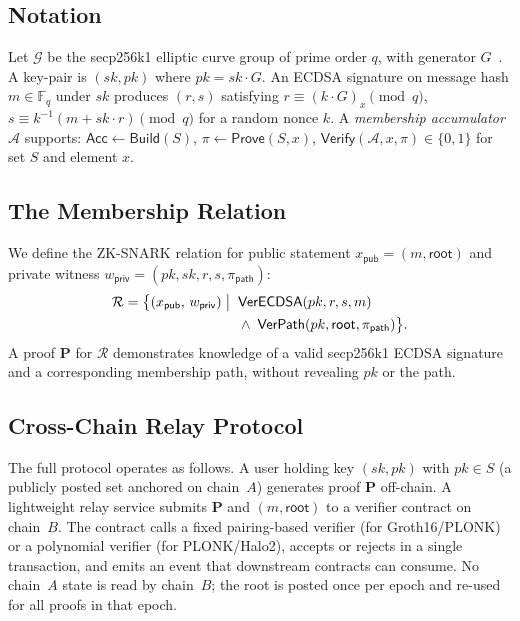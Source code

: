 \documentclass[conference]{IEEEtran}
\begin{document}
\subsection{Notation}

Let $\mathcal{G}$ be the secp256k1 elliptic curve group of prime order $q$,
with generator $G$~\cite{secp256k1}.
A key-pair is $(sk, pk)$ where $pk = sk \cdot G$.
An ECDSA signature on message hash $m \in \mathbb{F}_q$ under $sk$ produces
$(r,s)$ satisfying $r \equiv (k \cdot G)_x \pmod{q}$,
$s \equiv k^{-1}(m + sk \cdot r) \pmod{q}$ for a random nonce $k$.
A \emph{membership accumulator} $\mathcal{A}$ supports:
$\mathsf{Acc} \leftarrow \mathsf{Build}(S)$,
$\pi \leftarrow \mathsf{Prove}(S, x)$,
$\mathsf{Verify}(\mathcal{A}, x, \pi) \in \{0,1\}$
for set $S$ and element $x$.

\subsection{The Membership Relation}

We define the ZK-SNARK relation for public statement
$x_\mathsf{pub} = (m, \mathsf{root})$ and private witness
$w_\mathsf{priv} = (pk, sk, r, s, \pi_\mathsf{path})$:
\begin{align}
\mathcal{R} = \bigl\{(x_\mathsf{pub},\, w_\mathsf{priv}) \;\big|\;
  &\;\mathsf{VerECDSA}(pk, r, s, m) \notag\\
  &\;\wedge\; \mathsf{VerPath}(pk, \mathsf{root}, \pi_\mathsf{path})
\bigr\}.
\label{eq:relation}
\end{align}
A proof $\mathbf{P}$ for $\mathcal{R}$ demonstrates knowledge of a valid
secp256k1 ECDSA signature and a corresponding membership path,
without revealing $pk$ or the path.

\subsection{Cross-Chain Relay Protocol}

The full protocol operates as follows.
A user holding key $(sk, pk)$ with $pk \in S$ (a publicly posted set
anchored on chain~$A$) generates proof $\mathbf{P}$ off-chain.
A lightweight relay service submits $\mathbf{P}$ and $(m, \mathsf{root})$
to a verifier contract on chain~$B$.
The contract calls a fixed pairing-based verifier (for Groth16/PLONK)
or a polynomial verifier (for PLONK/Halo2), accepts or rejects in a
single transaction, and emits an event that downstream contracts can
consume.
No chain~$A$ state is read by chain~$B$; the root is posted once per
epoch and re-used for all proofs in that epoch.
\end{document}
